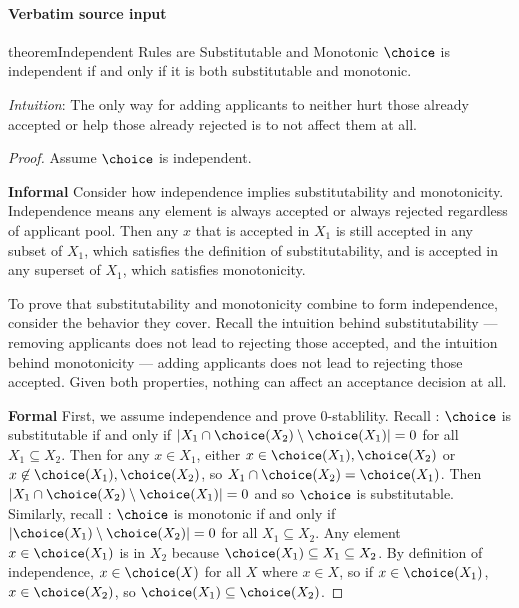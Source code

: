 \documentclass[10pt]{article}
\begin{document}
\paragraph{Verbatim source input}
\begin{ReviewVerbatim}
\begin{restatable}{theorem}{Independent Rules are Substitutable and Monotonic}
\label{thm:independent-sub-mon}
$\choice$ is independent if and only if it is both substitutable and monotonic.
\end{restatable}

\textit{Intuition}: The only way for adding applicants to neither hurt those already accepted or help those already rejected is to not affect them at all.
\begin{proof}
    Assume $\choice$ is independent.

    \textbf{Informal}
    Consider how independence implies substitutability and monotonicity. Independence means any element is always accepted or always rejected regardless of applicant pool. Then any $x$ that is accepted in $X_1$ is still accepted in any subset of $X_1$, which satisfies the definition of substitutability, and is accepted in any superset of $X_1$, which satisfies monotonicity.

    To prove that substitutability and monotonicity combine to form independence, consider the behavior they cover. Recall the intuition behind substitutability --- removing applicants does not lead to rejecting those accepted, and the intuition behind monotonicity --- adding applicants does not lead to rejecting those accepted. Given both properties, nothing can affect an acceptance decision at all.

    \textbf{Formal}
    First, we assume independence and prove $0$-stablility.
    Recall : $\choice$ is substitutable if and only if $|X_1 \cap \choice(X_2) \setminus \choice(X_1)| = 0$ for all $X_1 \subseteq X_2$. Then for any $x \in X_1$, either $x \in \choice(X_1),\choice(X_2)$ or $x \not\in \choice(X_1),\choice(X_2)$, so $X_1 \cap \choice(X_2) = \choice(X_1)$. Then $|X_1 \cap \choice(X_2) \setminus \choice(X_1)| = 0$ and so $\choice$ is substitutable. Similarly, recall : $\choice$ is monotonic if and only if $|\choice(X_1) \setminus \choice(X_2)| = 0$ for all $X_1 \subseteq X_2$. Any element $x \in \choice(X_1)$ is in $X_2$ because $\choice(X_1) \subseteq X_1 \subseteq X_2$. By definition of independence, $x \in \choice(X)$ for all $X$ where $x \in X$, so if $x \in \choice(X_1)$, $x \in \choice(X_2)$, so $\choice(X_1) \subseteq \choice(X_2)$.


\end{proof}
\end{ReviewVerbatim}
\end{document}
